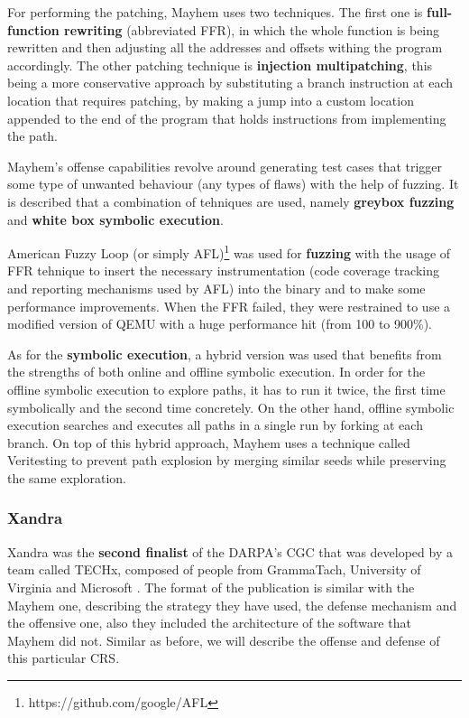 \documentclass[12pt,a4paper,english,onecolumn]{IEEEtran}
\begin{document}
For performing the patching, Mayhem uses two techniques.  The first one is \textbf{full-function rewriting} (abbreviated FFR), in which the whole function is being rewritten and then adjusting all the addresses and offsets withing the program accordingly. The other patching technique is \textbf{injection multipatching}, this being a more conservative approach by substituting a branch instruction at each location that requires patching, by making a jump into a custom location appended to the end of the program that holds instructions from implementing the path.

Mayhem's offense capabilities revolve around generating test cases that trigger some type of unwanted behaviour (any types of flaws) with the help of fuzzing. It is described that a combination of tehniques are used, namely \textbf{greybox fuzzing} and \textbf{white box symbolic execution}.

American Fuzzy Loop (or simply AFL)\footnote{https://github.com/google/AFL} was used for \textbf{fuzzing} with the usage of FFR tehnique to insert the necessary instrumentation (code coverage tracking and reporting mechanisms used by AFL) into the binary and to make some performance improvements. When the FFR failed, they were restrained to use a modified version of QEMU with a huge performance hit (from 100 to 900\%).

As for the \textbf{symbolic execution}, a hybrid version was used that benefits from the strengths of both online and offline symbolic execution. In order for the offline symbolic execution to explore paths, it has to run it twice, the first time symbolically and the second time concretely. On the other hand, offline symbolic execution searches and executes all paths in a single run by forking at each branch. On top of this hybrid approach, Mayhem uses a technique called Veritesting \cite{enhanced_symex} to prevent path explosion by merging similar seeds while preserving the same exploration.

\subsubsection{Xandra}

Xandra was the \textbf{second finalist} of the DARPA's CGC that was developed by a team called TECHx, composed of people from GrammaTach, University of Virginia and Microsoft \cite{xandra}. The format of the publication is similar with the Mayhem one, describing the strategy they have used, the defense mechanism and the offensive one, also they included the architecture of the software that Mayhem did not. Similar as before, we will describe the offense and defense of this particular CRS.
\end{document}
